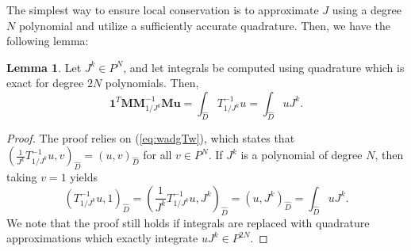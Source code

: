 \documentclass[preprint,10pt]{article}
\theoremstyle{definition}
\theoremstyle{lemma}
\newtheorem{lemma}{Lemma}
\theoremstyle{theorem}
\theoremstyle{assumption}
\renewcommand{\hat}{\widehat}
\newcommand{\LRp}[1]{\left( #1 \right)}
\begin{document}
{The simplest way to ensure local conservation is to approximate $J$ using a degree $N$ polynomial and utilize a sufficiently accurate quadrature.  Then, we have the following lemma:
\begin{lemma}
Let $J^k \in P^N$, and let integrals be computed using quadrature which is exact for degree $2N$ polynomials.  Then, 
\[
\bm{1}^T\bm{M}\bm{M}^{-1}_{1/J^k}\bm{M}\bm{u} = \int_{\hat{D}}T^{-1}_{1/J^k} u =  \int_{\hat{D}} u J^k.
\]
\label{eq:conscorrect1}
\end{lemma}
\begin{proof}
The proof relies on (\ref{eq:wadgTw}), which states that $\LRp{\frac{1}{J^k} T^{-1}_{1/J^k}u,v}_{\hat{D}} = \LRp{u,v}_{\hat{D}}$ for all $v\in P^N$.  If $J^k$ is a polynomial of degree $N$, then taking $v = 1$ yields
\[
\LRp{T^{-1}_{1/J^k}u,1}_{\hat{D}} = \LRp{\frac{1}{J^k}T^{-1}_{1/J^k}u,{J^k}}_{\hat{D}}= \LRp{u,{J^k}}_{\hat{D}} = \int_{\hat{D}} uJ^k. 
\]
We note that the proof still holds if integrals are replaced with quadrature approximations which exactly integrate $uJ^k \in P^{2N}$.
\end{proof}

}
\end{document}
